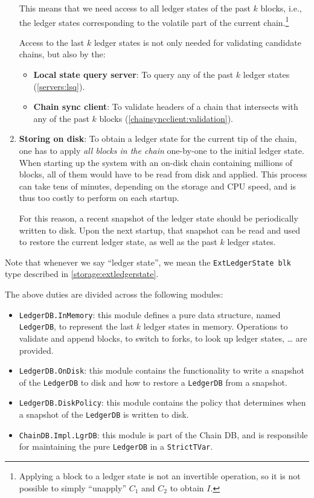 \begin{enumerate}
  This means that we need access to all ledger states of the past $k$ blocks,
  i.e., the ledger states corresponding to the volatile part of the current
  chain.\footnote{Applying a block to a ledger state is not an invertible
  operation, so it is not possible to simply ``unapply'' $C_1$ and $C_2$ to
  obtain $I$.}

  Access to the last $k$ ledger states is not only needed for validating candidate
  chains, but also by the:
  \begin{itemize}
  \item \textbf{Local state query server}: To query any of the past $k$ ledger
    states (\cref{servers:lsq}).
  \item \textbf{Chain sync client}: To validate headers of a chain that
    intersects with any of the past $k$ blocks
    (\cref{chainsyncclient:validation}).
  \end{itemize}

\item \textbf{Storing on disk}: To obtain a ledger state for the current tip of
  the chain, one has to apply \emph{all blocks in the chain} one-by-one to the
  initial ledger state. When starting up the system with an on-disk chain
  containing millions of blocks, all of them would have to be read from disk and
  applied. This process can take tens of minutes, depending on the storage and
  CPU speed, and is thus too costly to perform on each startup.

  For this reason, a recent snapshot of the ledger state should be periodically
  written to disk. Upon the next startup, that snapshot can be read and used to
  restore the current ledger state, as well as the past $k$ ledger states.
\end{enumerate}

Note that whenever we say ``ledger state'', we mean the
\lstinline!ExtLedgerState blk! type described in \cref{storage:extledgerstate}.

The above duties are divided across the following modules:

\begin{itemize}
\item \lstinline!LedgerDB.InMemory!: this module defines a pure data structure,
  named \lstinline!LedgerDB!, to represent the last $k$ ledger states in memory.
  Operations to validate and append blocks, to switch to forks, to look up
  ledger states, \ldots{} are provided.
\item \lstinline!LedgerDB.OnDisk!: this module contains the functionality to
  write a snapshot of the \lstinline!LedgerDB! to disk and how to restore a
  \lstinline!LedgerDB! from a snapshot.
\item \lstinline!LedgerDB.DiskPolicy!: this module contains the policy that
  determines when a snapshot of the \lstinline!LedgerDB! is written to disk.
\item \lstinline!ChainDB.Impl.LgrDB!: this module is part of the Chain DB, and
  is responsible for maintaining the pure \lstinline!LedgerDB! in a
  \lstinline!StrictTVar!.
\end{itemize}

